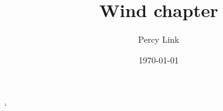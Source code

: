 \documentclass[12pt]{amsart}
\title{Wind chapter}
\author{Percy Link}
\date{\currenttime  \today}
\begin{document}
\maketitle








`

\end{document}
